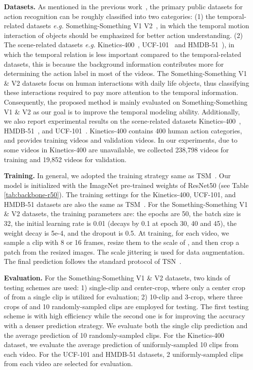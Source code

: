 \documentclass[journal]{IEEEtran}
\begin{document}
\noindent \textbf{Datasets.}
As mentioned in the previous work~\cite{jiang2019stm}, the primary public datasets for action recognition can be roughly classified into two categories: (1) the temporal-related datasets \textit{e.g.} Something-Something V1  V2~\cite{goyal2017something}, in which the temporal motion interaction of objects should be emphasized for better action understanding. (2) The scene-related datasets \textit{e.g.} Kinetics-400~\cite{kay2017kinetics}, UCF-101~\cite{soomro2012ucf101} and HMDB-51~\cite{Kuehne11}), in which the temporal relation is less important compared to the temporal-related datasets, this is because the background information contributes more for determining the action label in most of the videos. The Something-Something V1 \& V2 datasets focus on human interactions with daily life objects, thus classifying these interactions required to pay more attention to the temporal information. Consequently, the proposed method is mainly evaluated on Something-Something V1 \& V2 as our goal is to improve the temporal modeling ability. Additionally, we also report experimental results on the scene-related datasets Kinetics-400~\cite{kay2017kinetics}, HMDB-51~\cite{Kuehne11}, and UCF-101~\cite{soomro2012ucf101}. Kinetics-400 contains 400 human action categories, and provides  training videos and  validation videos. In our experiments, due to some videos in Kinetics-400 are unavailable, we collected 238,798 videos for training and 19,852 videos for validation.

\noindent \textbf{Training.} In general, we adopted the training strategy same as TSM~\cite{lin2019tsm}. Our model is initialized with the ImageNet pre-trained weights of ResNet50 (see Table \ref{tab:backbone-r50}). The training settings for the Kinetics-400, UCF-101, and HMDB-51 datasets are also the same as TSM~\cite{lin2019tsm}. For the Something-Something V1 \& V2 datasets, the training parameters are: the epochs are 50, the batch size is 32, the initial learning rate is 0.01 (decays by 0.1 at epoch 30, 40 and 45), the weight decay is 5e-4, and the dropout is 0.5. At training, for each video, we sample a clip with 8 or 16 frames, resize them to the scale of , and then crop a  patch from the resized images. The scale jittering is used for data augmentation. The final prediction follows the standard protocol of TSN~\cite{wang2016temporal}.

\noindent \textbf{Evaluation.} For the Something-Something V1 \& V2 datasets, two kinds of testing schemes are used: 1) single-clip and center-crop, where only a center crop of  from a single clip is utilized for evaluation; 2) 10-clip and 3-crop, where three crops of  and 10 randomly-sampled clips are employed for testing. The first testing scheme is with high efficiency while the second one is for improving the accuracy with a denser prediction strategy. We evaluate both the single clip prediction and the average prediction of 10 randomly-sampled clips. For the Kinetics-400 dataset, we evaluate the average prediction of uniformly-sampled 10 clips from each video. For the UCF-101 and HMDB-51 datasets, 2 uniformly-sampled clips from each video are selected for evaluation.
\end{document}
